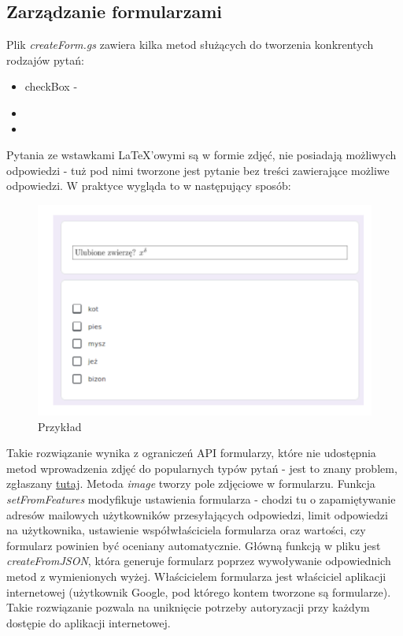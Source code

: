 \subsection{Zarządzanie formularzami}
Plik \textit{createForm.gs} zawiera kilka metod służących do tworzenia konkrentych rodzajów pytań:
\begin{itemize} %
\item checkBox - 
\item
\item

\end{itemize}
Pytania ze wstawkami \LaTeX{}'owymi są w formie zdjęć, nie posiadają możliwych odpowiedzi - tuż pod nimi tworzone jest pytanie bez treści zawierające możliwe odpowiedzi. W praktyce wygląda to w następujący sposób:
\begin{figure}[H]
  \includegraphics{przyklad.png}
  \caption{Przykład}
  \label{fig:1}
\end{figure}
Takie rozwiązanie wynika z ograniczeń  API formularzy, które nie udostępnia metod wprowadzenia zdjęć do popularnych typów pytań - jest to znany problem, zgłaszany \href{https://issuetracker.google.com/issues/36765518?pli=1}{tutaj}. Metoda \textit{image} tworzy pole zdjęciowe w formularzu. 
Funkcja \textit{setFromFeatures} modyfikuje ustawienia formularza - chodzi tu o zapamiętywanie adresów mailowych użytkowników przesyłających odpowiedzi, limit odpowiedzi na użytkownika, ustawienie współwłaściciela formularza oraz wartości, czy formularz powinien być oceniany automatycznie.
\ind Główną funkcją w pliku jest \textit{createFromJSON}, która generuje formularz poprzez wywoływanie odpowiednich metod z wymienionych wyżej. Właścicielem formularza jest właściciel aplikacji internetowej (użytkownik Google, pod którego  kontem tworzone są formularze). Takie rozwiązanie pozwala na uniknięcie potrzeby autoryzacji przy każdym dostępie do aplikacji internetowej.

